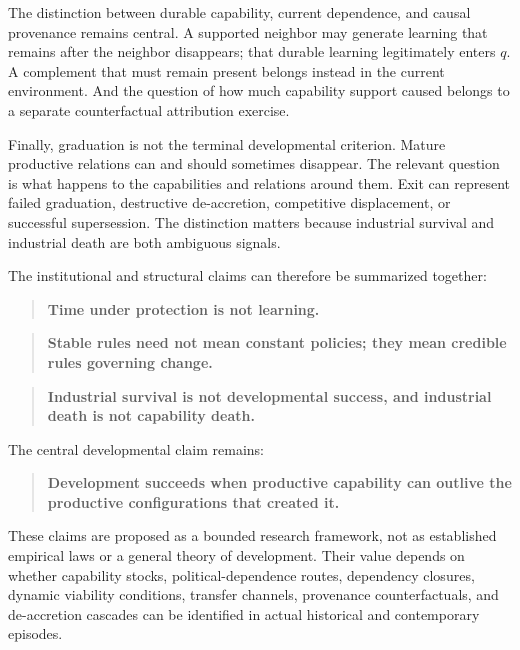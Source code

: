 The distinction between durable capability, current dependence, and causal provenance remains central. A supported neighbor may generate learning that remains after the neighbor disappears; that durable learning legitimately enters $q$. A complement that must remain present belongs instead in the current environment. And the question of how much capability support caused belongs to a separate counterfactual attribution exercise.

Finally, graduation is not the terminal developmental criterion. Mature productive relations can and should sometimes disappear. The relevant question is what happens to the capabilities and relations around them. Exit can represent failed graduation, destructive de-accretion, competitive displacement, or successful supersession. The distinction matters because industrial survival and industrial death are both ambiguous signals.

The institutional and structural claims can therefore be summarized together:
\begin{quote}
\textbf{Time under protection is not learning.}
\end{quote}
\begin{quote}
\textbf{Stable rules need not mean constant policies; they mean credible rules governing change.}
\end{quote}
\begin{quote}
\textbf{Industrial survival is not developmental success, and industrial death is not capability death.}
\end{quote}
The central developmental claim remains:
\begin{quote}
\textbf{Development succeeds when productive capability can outlive the productive configurations that created it.}
\end{quote}
These claims are proposed as a bounded research framework, not as established empirical laws or a general theory of development. Their value depends on whether capability stocks, political-dependence routes, dependency closures, dynamic viability conditions, transfer channels, provenance counterfactuals, and de-accretion cascades can be identified in actual historical and contemporary episodes.
